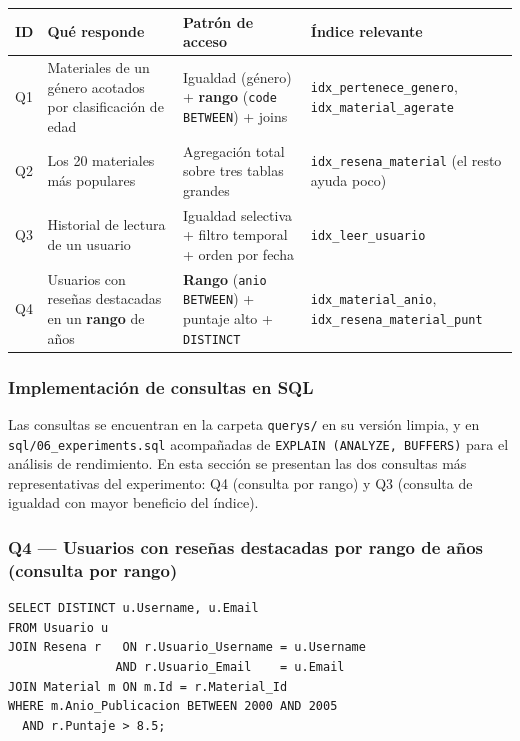 \documentclass[12pt,a4paper]{article}
\begin{document}
\begin{center}
\begin{longtable}{p{1.1cm}p{4.3cm}p{4.0cm}p{3.4cm}}
\toprule
\textbf{ID} & \textbf{Qué responde} & \textbf{Patrón de acceso} & \textbf{Índice relevante} \\
\midrule
\endhead
Q1 & Materiales de un género acotados por clasificación de edad & Igualdad (género) + \textbf{rango} (\texttt{code BETWEEN}) + joins & \texttt{idx\_pertenece\_genero}, \texttt{idx\_material\_agerate} \\
Q2 & Los 20 materiales más populares & Agregación total sobre tres tablas grandes & \texttt{idx\_resena\_material} (el resto ayuda poco) \\
Q3 & Historial de lectura de un usuario & Igualdad selectiva + filtro temporal + orden por fecha & \texttt{idx\_leer\_usuario} \\
Q4 & Usuarios con reseñas destacadas en un \textbf{rango} de años & \textbf{Rango} (\texttt{anio BETWEEN}) + puntaje alto + \texttt{DISTINCT} & \texttt{idx\_material\_anio}, \texttt{idx\_resena\_material\_punt} \\
\bottomrule
\end{longtable}
\end{center}

\subsubsection{Implementación de consultas en SQL}

Las consultas se encuentran en la carpeta \texttt{querys/} en su versión limpia, y en \\ \texttt{sql/06\_experiments.sql} acompañadas de \texttt{EXPLAIN (ANALYZE, BUFFERS)} para el análisis de rendimiento. En esta sección se presentan las dos consultas más representativas del experimento: Q4 (consulta por rango) y Q3 (consulta de igualdad con mayor beneficio del índice).

\subsubsection*{Q4 --- Usuarios con reseñas destacadas por rango de años (consulta por rango)}

\begin{lstlisting}
SELECT DISTINCT u.Username, u.Email
FROM Usuario u
JOIN Resena r   ON r.Usuario_Username = u.Username
               AND r.Usuario_Email    = u.Email
JOIN Material m ON m.Id = r.Material_Id
WHERE m.Anio_Publicacion BETWEEN 2000 AND 2005
  AND r.Puntaje > 8.5;
\end{lstlisting}
\end{document}
